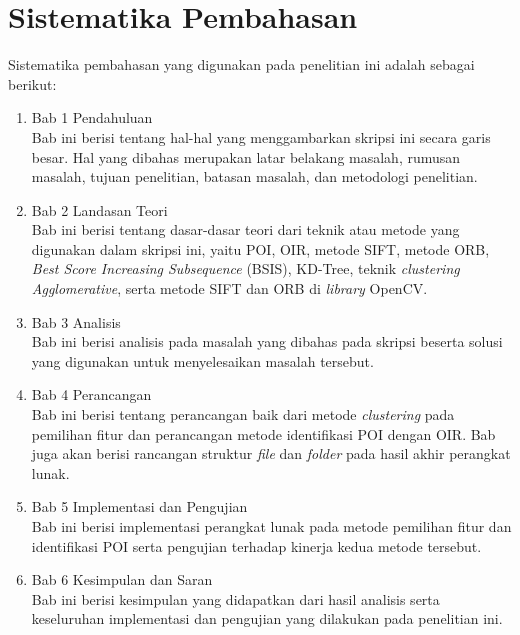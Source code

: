 \section{Sistematika Pembahasan}
\label{sec:sispem}
Sistematika pembahasan yang digunakan pada penelitian ini adalah sebagai berikut:
\begin{enumerate}
	\item Bab 1 Pendahuluan \\
	Bab ini berisi tentang hal-hal yang menggambarkan skripsi ini secara garis besar. Hal yang dibahas merupakan latar belakang masalah, rumusan masalah, tujuan penelitian, batasan masalah, dan metodologi penelitian.
	\item Bab 2 Landasan Teori \\
	Bab ini berisi tentang dasar-dasar teori dari teknik atau metode yang digunakan dalam skripsi ini, yaitu POI, OIR, metode SIFT, metode ORB, \textit{Best Score Increasing Subsequence} (BSIS), KD-Tree, teknik \textit{clustering} \textit{Agglomerative}, serta metode SIFT dan ORB di \textit{library} OpenCV.
	\item Bab 3 Analisis \\
	Bab ini berisi analisis pada masalah yang dibahas pada skripsi beserta solusi yang digunakan untuk menyelesaikan masalah tersebut.
	\item Bab 4 Perancangan \\
	Bab ini berisi tentang perancangan baik dari metode \textit{clustering} pada pemilihan fitur dan perancangan metode identifikasi POI dengan OIR. Bab juga akan berisi rancangan struktur \textit{file} dan \textit{folder} pada hasil akhir perangkat lunak.
	\item Bab 5 Implementasi dan Pengujian \\
	Bab ini berisi implementasi perangkat lunak pada metode pemilihan fitur dan identifikasi POI serta pengujian terhadap kinerja kedua metode tersebut.
	\item Bab 6 Kesimpulan dan Saran \\
	Bab ini berisi kesimpulan yang didapatkan dari hasil analisis serta keseluruhan implementasi dan pengujian yang dilakukan pada penelitian ini.
\end{enumerate}